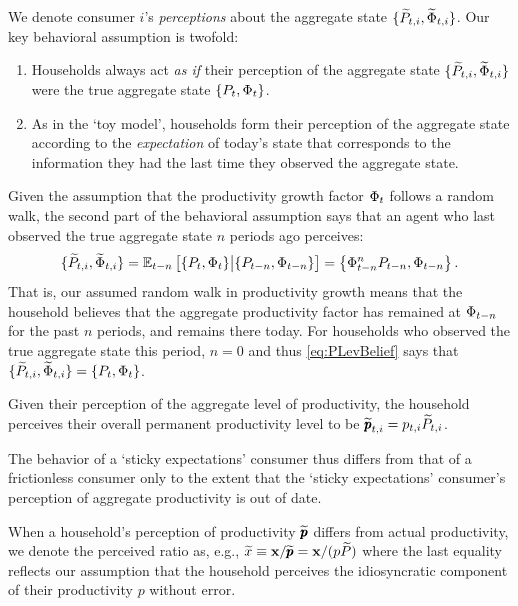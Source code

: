 \documentclass[titlepage]{./econtex}
\begin{document}
We denote consumer $i$'s \textit{perceptions} about the aggregate state $\{\widetilde{P}_{t,i},\widetilde{\Phi}_{t,i}\}$.  Our key behavioral assumption is twofold:
\begin{enumerate}
\item Households always act \textit{as if} their perception of the aggregate state $\{\widetilde{P}_{t,i},\widetilde{\Phi}_{t,i}\}$ were the true aggregate state $\{P_t,\Phi_t\}$.

\item As in the `toy model', households form their perception of the aggregate state according to the \textit{expectation} of today's state that corresponds to the information they had the last time they observed the aggregate state.
\end{enumerate}
Given the assumption that the productivity growth factor $\Phi_t$ follows a random walk,
the second part of the behavioral assumption says that an agent who last observed the true
aggregate state $n$ periods ago perceives:
\begin{equation}\label{eq:PLevBelief}
\{\widetilde{P}_{t,i},\widetilde{\Phi}_{t,i}\} = \operatorname{\mathbb{E}}_{t-n}\big[\{P_t,\Phi_t\} \big| \{P_{t-n},\Phi_{t-n}\}\big] = \left\{\Phi_{t-n}^{n} P_{t-n},\Phi_{t-n}\right\}.
\end{equation}
That is, our assumed random walk in productivity growth means that the household believes that the aggregate productivity factor has remained at $\Phi_{t-n}$ for the past $n$ periods, and remains there today. For households who observed the true aggregate state this period, $n=0$ and thus \eqref{eq:PLevBelief} says that $\{\widetilde{P}_{t,i},\widetilde{\Phi}_{t,i}\} = \{P_t,\Phi_t\}$.

Given their perception of the aggregate level of productivity, the household perceives their overall permanent productivity level to be $\widetilde{\pmb{p}}_{t,i} = p_{t,i} \widetilde{P}_{t,i}$.

The behavior of a `sticky expectations' consumer thus differs from that of a frictionless consumer only to the extent that the `sticky expectations' consumer's perception of aggregate productivity is out of date.

When a household's perception of productivity $\widetilde{\pmb{p}}$ differs from actual productivity, we denote the perceived ratio as, e.g., $\widetilde{x} \equiv \mathbf{x}/\widetilde{\pmb{p}} = \mathbf{x}/({p}\widetilde{P})$ where the last equality reflects our assumption that the household perceives the idiosyncratic component of their productivity ${p}$ without error.
\end{document}
